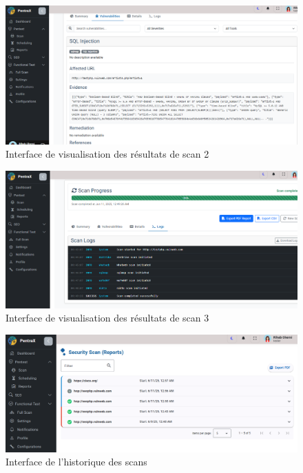 \begin{justify}
\begin{enumerate}[label=\Alph*.]
                     \begin{figure}[H]
                        \centering
                        \includegraphics[width=\textwidth]{chapitres/ch3Sp1/section/sprint2/img/interface/vle.PNG}
                        \caption{Interface de visualisation des résultats de scan 2}
                        \label{fig:interface_resultats_scan2}
                    \end{figure} 
                    \begin{figure}[H]
                        \centering
                        \includegraphics[width=\textwidth]{chapitres/ch3Sp1/section/sprint2/img/interface/logs.PNG}
                        \caption{Interface de visualisation des résultats de scan 3}
                        \label{fig:interface_resultats_scan2}
                    \end{figure} 
                    \begin{figure}[H]
                        \centering
                        \includegraphics[width=\textwidth]{chapitres/ch3Sp1/section/sprint2/img/interface/table-sec.PNG}
                        \caption{Interface de l’historique des scans}
                        \label{fig:interface_historique_scans}
                    \end{figure}
    

\end{enumerate}
\end{justify}
